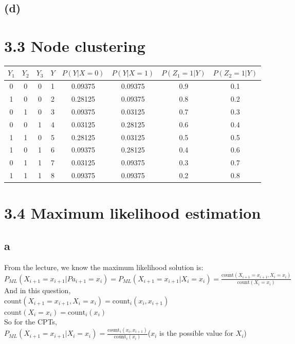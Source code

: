 \documentclass [11pt, a4paper, oneside] {article}
\begin{document}
\subsection *{(d)}
\section *{3.3 Node clustering}
\begin{table}[!hbp]
\begin{tabular}{|c|c|c|c|c|c|c|c|}
\hline
$Y_1$&$Y_2$&$Y_3$&$Y$&$P(Y|X=0)$&$P(Y|X=1)$&$P(Z_1=1|Y)$&$P(Z_2=1|Y)$\\
\hline
0&0&0&1&0.09375&0.09375&0.9&0.1\\
\hline
1&0&0&2&0.28125&0.09375&0.8&0.2\\
\hline
0&1&0&3&0.09375&0.03125&0.7&0.3\\
\hline
0&0&1&4&0.03125&0.28125&0.6&0.4\\
\hline
1&1&0&5&0.28125&0.03125&0.5&0.5\\
\hline
1&0&1&6&0.09375&0.28125&0.4&0.6\\
\hline
0&1&1&7&0.03125&0.09375&0.3&0.7\\
\hline
1&1&1&8&0.09375&0.09375&0.2&0.8\\
\hline
\end{tabular}
\end{table}
\section *{3.4 Maximum likelihood estimation}
\subsection *{a}
From the lecture, we know the maximum likelihood solution is:\\
$P_{ML}(X_{i+1} = x_{i+1}| Pa_{i+1} = x_{i}) = P_{ML}(X_{i+1} = x_{i+1}| X_{i} = x_{i}) = \frac{\textrm{count}(X_{i+1}=x_{i+1}, X_i=x_i)}{\textrm{count}(X_i=x_i)} $ \\
And in this question, \\
$\textrm{count}(X_{i+1}=x_{i+1}, X_i=x_i) = \textrm{count}_i(x_i, x_{i+1})$\\
$\textrm{count}(X_i=x_i) = \textrm{count}_i(x_i)$\\
So for the CPTs, \\
$P_{ML}(X_{i+1} = x_{i+1}| X_{i} = x_{i}) = \frac{\textrm{count}_i(x_i, x_{i+1})}{\textrm{count}_i(x_i)}$($x_i$ is the possible value for $X_i$)\\
\end{document}
